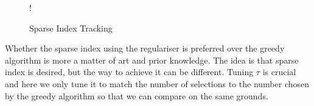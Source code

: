 \documentclass[11pt]{article}
\begin{document}
\begin{figure}[!h]
   \centering 
 	 {!} { }
    \caption{Sparse Index Tracking}
	\label{fig:q2-all-based-on-first}
	\vspace{-0.5cm}
\end{figure}

Whether the sparse index using the regulariser is preferred over the greedy algorithm is more a matter of art and prior 
knowledge. The idea is that sparse index is desired, but the way to achieve it can be different. Tuning $\tau$ is crucial and
here we only tune it to match the number of selections to the number chosen by the greedy algorithm so that we can compare
on the same grounds.
\end{document}

